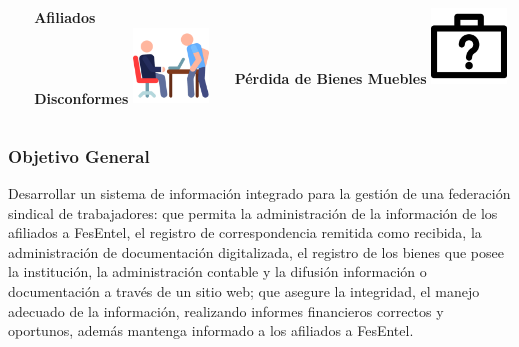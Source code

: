 \documentclass[xcolor=dvipsnames, xcolor=table]{beamer}
\begin{document}
\begin{frame}
\begin{columns}
\begin{column}{0.3\textwidth}
      \end{column}
      \begin{column}{0.3\textwidth}
        \centering\textbf{\textcolor{color3}{\small Afiliados\\Disconformes}\vspace{3mm}}
        \vspace{10mm}
        \includegraphics[width=20mm]{032-anger}
      \end{column}
      \begin{column}{0.3\textwidth}
        \centering\textbf{\textcolor{color3}{\small Pérdida de Bienes Muebles}\vspace{3mm}}
        \vspace{10mm}
        \includegraphics[width=20mm]{029-lost-items}
      \end{column}      
    \end{columns}
\end{frame}

\begin{frame}
    \frametitle{Objetivo General}
 
  \centering\large Desarrollar un sistema de información integrado para la gestión de una federación
sindical de trabajadores: que permita la administración de la información de
los afiliados a FesEntel, el registro de correspondencia remitida como recibida,
la administración de documentación digitalizada, el registro de los bienes
que posee la institución, la administración contable y la difusión información
o documentación a través de un sitio web; que asegure la integridad, el
manejo adecuado de la información, realizando informes financieros correctos
y oportunos, además mantenga informado a los afiliados a FesEntel.

\end{frame}
\end{document}
